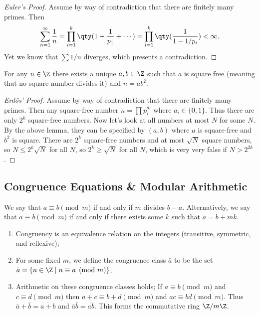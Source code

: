 \begin{proof}[Euler's Proof]
Assume by way of contradiction that there are finitely many primes. Then 
\[ \sum_{n=1}^\infty \frac{1}{n} = \prod_{i=1}^k\qty(1 + \frac{1}{p_1} + \cdots) = \prod_{i=1}^k \qty(\frac{1}{1-1/p_i}) < \infty. \]
Yet we know that $\sum 1/n$ diverges, which presents a contradiction.
\end{proof}

\begin{lemma}
For any $n \in \Z$ there exists a unique $a,b \in \Z$ such that $a$ is square free (meaning that no square number divides it) and $n = ab^2$.
\end{lemma}

\begin{proof}[Erdős' Proof]
Assume by way of contradiction that there are finitely many primes. Then any square-free number $n = \prod p_i^{a_i}$ where $a_i \in \{0,1\}$. Thus there are only $2^k$ square-free numbers. Now let's look at all numbers at most $N$ for some $N$. By the above lemma, they can be specified by $(a,b)$ where $a$ is square-free and $b^2$ is square. There are $2^k$ square-free numbers and at most $\sqrt{N}$ square numbers, so $N \leq 2^k\sqrt{N}$ for all $N$, so $2^k \geq \sqrt{N}$ for all $N$, which is very very false if $N > 2^{2k}$.
\end{proof}

\subsection{Congruence Equations \& Modular Arithmetic}

\begin{definition}[Congruence]
We say that $a \equiv b \pmod{m}$ if and only if $m$ divides $b-a$. Alternatively, we say that $a \equiv b \pmod{m}$ if and only if there exists some $k$ such that $a = b + mk$.
\end{definition}

\begin{theorem} \hfill
\begin{enumerate}
\item Congruency is an equivalence relation on the integers (transitive, symmetric, and reflexive);
\item For some fixed $m$, we define the congruence class $\bar{a}$ to be the set $\bar{a} = \{n \in \Z \mid n \equiv a \pmod{m}\}$;
\item Arithmetic on these congruence classes holds; If $a \equiv b \pmod{m}$ and $c \equiv d \pmod{m}$ then $a+c \equiv b + d \pmod{m}$ and $ac \equiv bd \pmod{m}$. Thus $\bar{a} + \bar{b} = \overline{a + b}$ and $\bar{a}\bar{b} = \overline{ab}$. This forms the commutative ring $\Z/m\Z$.
\end{enumerate}
\end{theorem}

